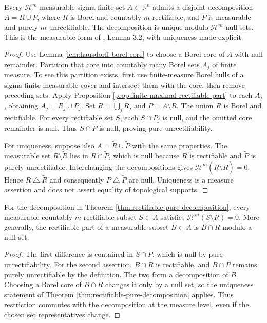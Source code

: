\begin{theorem}\label{thm:rectifiable-pure-decomposition}
Every $\mathcal H^m$-measurable sigma-finite set $A\subset\mathbb R^n$ admits a disjoint decomposition $A=R\cup P$, where $R$ is Borel and countably $m$-rectifiable, and $P$ is measurable and purely $m$-unrectifiable. The decomposition is unique modulo $\mathcal H^m$-null sets. This is the measurable form of \cite{Sim18}, Lemma 3.2, with uniqueness made explicit.
\end{theorem}
\begin{proof}
Use Lemma \ref{lem:hausdorff-borel-core} to choose a Borel core of $A$ with null remainder. Partition that core into countably many Borel sets $A_j$ of finite measure. To see this partition exists, first use finite-measure Borel hulls of a sigma-finite measurable cover and intersect them with the core, then remove preceding sets. Apply Proposition \ref{prop:finite-maximal-rectifiable-part} to each $A_j$, obtaining $A_j=R_j\cup P_j$. Set $R=\bigcup_jR_j$ and $P=A\setminus R$. The union $R$ is Borel and rectifiable. For every rectifiable set $S$, each $S\cap P_j$ is null, and the omitted core remainder is null. Thus $S\cap P$ is null, proving pure unrectifiability.

For uniqueness, suppose also $A=\widetilde R\cup\widetilde P$ with the same properties. The measurable set $R\setminus\widetilde R$ lies in $R\cap\widetilde P$, which is null because $R$ is rectifiable and $\widetilde P$ is purely unrectifiable. Interchanging the decompositions gives $\mathcal H^m(\widetilde R\setminus R)=0$. Hence $R\mathbin\triangle\widetilde R$ and consequently $P\mathbin\triangle\widetilde P$ are null. Uniqueness is a measure assertion and does not assert equality of topological supports.
\end{proof}

\begin{corollary}\label{cor:rectifiable-part-maximal-null}
For the decomposition in Theorem \ref{thm:rectifiable-pure-decomposition}, every measurable countably $m$-rectifiable subset $S\subset A$ satisfies $\mathcal H^m(S\setminus R)=0$. More generally, the rectifiable part of a measurable subset $B\subset A$ is $B\cap R$ modulo a null set.
\end{corollary}
\begin{proof}
The first difference is contained in $S\cap P$, which is null by pure unrectifiability. For the second assertion, $B\cap R$ is rectifiable, and $B\cap P$ remains purely unrectifiable by the definition. The two form a decomposition of $B$. Choosing a Borel core of $B\cap R$ changes it only by a null set, so the uniqueness statement of Theorem \ref{thm:rectifiable-pure-decomposition} applies. Thus restriction commutes with the decomposition at the measure level, even if the chosen set representatives change.
\end{proof}

